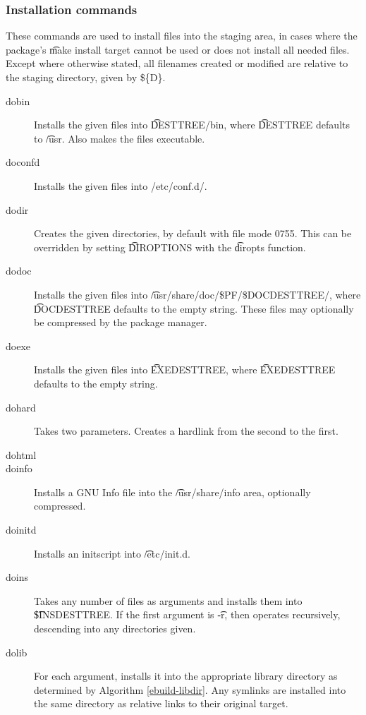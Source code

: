 \subsubsection{Installation commands}
These commands are used to install files into the staging area, in cases where the package's \t{make
install} target cannot be used or does not install all needed files. Except where otherwise stated,
all filenames created or modified are relative to the staging directory, given by \$\{D\}.

\begin{description}
\item[dobin] Installs the given files into \t{DESTTREE/bin}, where \t{DESTTREE} defaults to
    \t{/usr}. Also makes the files executable.

\item[doconfd] Installs the given files into /etc/conf.d/.

\item[dodir] Creates the given directories, by default with file mode 0755. This can be overridden
    by setting \t{DIROPTIONS} with the \t{diropts} function.

\item[dodoc] Installs the given files into \t{/usr/share/doc/\$PF/\$DOCDESTTREE/}, where
    \t{DOCDESTTREE} defaults to the empty string. These files may optionally be compressed by the
    package manager.

\item[doexe] Installs the given files into \t{EXEDESTTREE}, where \t{EXEDESTTREE} defaults to
    the empty string.

\item[dohard] Takes two parameters. Creates a hardlink from the second to the first.

\item[dohtml] 

\item[doinfo] Installs a GNU Info file into the \t{/usr/share/info} area, optionally compressed.

\item[doinitd] Installs an initscript into \t{/etc/init.d}.

\item[doins] Takes any number of files as arguments and installs them into \t{\$INSDESTTREE}. If
    the first argument is \t{-r}, then operates recursively, descending into any directories given.

\item[dolib] For each argument, installs it into the appropriate library directory as determined by
    Algorithm \ref{ebuild-libdir}. Any symlinks are installed into the same directory as relative
    links to their original target.


\end{description}
